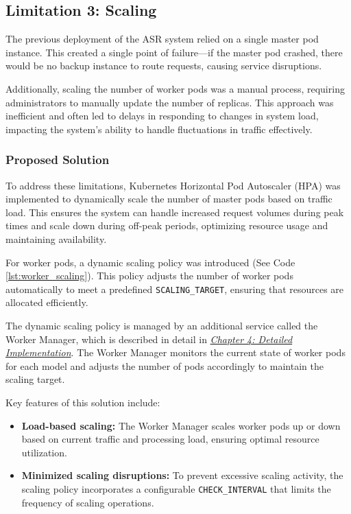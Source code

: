 \subsection{Limitation 3: Scaling}
The previous deployment of the ASR system relied on a single master pod instance. This created a single point of failure—if the master pod crashed, there would be no backup instance to route requests, causing service disruptions.

Additionally, scaling the number of worker pods was a manual process, requiring administrators to manually update the number of replicas. This approach was inefficient and often led to delays in responding to changes in system load, impacting the system’s ability to handle fluctuations in traffic effectively.

\subsubsection{Proposed Solution}
To address these limitations, Kubernetes Horizontal Pod Autoscaler (HPA) was implemented to dynamically scale the number of master pods based on traffic load. This ensures the system can handle increased request volumes during peak times and scale down during off-peak periods, optimizing resource usage and maintaining availability.

For worker pods, a dynamic scaling policy was introduced (See Code \ref{lst:worker_scaling}). This policy adjusts the number of worker pods automatically to meet a predefined \texttt{SCALING\_TARGET}, ensuring that resources are allocated efficiently.



The dynamic scaling policy is managed by an additional service called the Worker Manager, which is described in detail in \hyperref[subsection:worker_manager]{\textit{Chapter 4: Detailed Implementation}}. The Worker Manager monitors the current state of worker pods for each model and adjusts the number of pods accordingly to maintain the scaling target.

Key features of this solution include:
\begin{itemize}
    \item \textbf{Load-based scaling:}  The Worker Manager scales worker pods up or down based on current traffic and processing load, ensuring optimal resource utilization.
    \item \textbf{Minimized scaling disruptions:}  To prevent excessive scaling activity, the scaling policy incorporates a configurable \texttt{CHECK\_INTERVAL} that limits the frequency of scaling operations.
\end{itemize}


